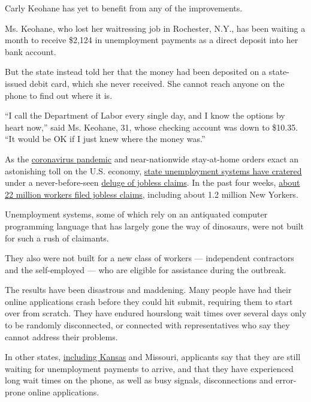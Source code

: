 Carly Keohane has yet to benefit from any of the improvements.

Ms. Keohane, who lost her waitressing job in Rochester, N.Y., has been
waiting a month to receive \$2,124 in unemployment payments as a direct
deposit into her bank account.

But the state instead told her that the money had been deposited on a
state-issued debit card, which she never received. She cannot reach
anyone on the phone to find out where it is.

``I call the Department of Labor every single day, and I know the
options by heart now,'' said Ms. Keohane, 31, whose checking account was
down to \$10.35. ``It would be OK if I just knew where the money was.''

As the
\href{https://www.nytimes.com/2020/04/15/nyregion/coronavirus-face-masks-andrew-cuomo.html}{coronavirus
pandemic} and near-nationwide stay-at-home orders exact an astonishing
toll on the U.S. economy,
\href{https://www.nytimes.com/2020/04/04/nyregion/coronavirus-ny-unemployment-benefits.html}{state
unemployment systems have cratered} under a never-before-seen
\href{https://www.nytimes.com/2020/04/02/business/economy/coronavirus-unemployment-claims.html}{deluge
of jobless claims}. In the past four weeks,
\href{https://www.nytimes.com/2020/04/16/business/economy/unemployment-numbers-coronavirus.html}{about
22 million workers filed jobless claims}, including about 1.2 million
New Yorkers.

Unemployment systems, some of which rely on an antiquated computer
programming language that has largely gone the way of dinosaurs, were
not built for such a rush of claimants.

They also were not built for a new class of workers --- independent
contractors and the self-employed --- who are eligible for assistance
during the outbreak.

The results have been disastrous and maddening. Many people have had
their online applications crash before they could hit submit, requiring
them to start over from scratch. They have endured hourslong wait times
over several days only to be randomly disconnected, or connected with
representatives who say they cannot address their problems.

In other states,
\href{https://www.kansascity.com/news/local/article242013491.html}{including
Kansas} and Missouri, applicants say that they are still waiting for
unemployment payments to arrive, and that they have experienced long
wait times on the phone, as well as busy signals, disconnections and
error-prone online applications.


